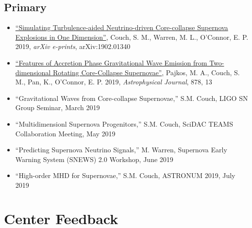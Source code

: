 \documentclass[12pt,titlepage]{article}
\begin{document}
\subsection{Primary}

\begin{itemize}
    \item \href{https://ui.adsabs.harvard.edu/#abs/2019arXiv190201340C/abstract}{``Simulating Turbulence-aided Neutrino-driven Core-collapse Supernova Explosions in One Dimension''}, Couch, S. M., Warren, M. L., O'Connor, E. P. 2019, {\itshape arXiv e-prints}, arXiv:1902.01340 
    \item \href{https://ui.adsabs.harvard.edu/#abs/2019arXiv190109055P/abstract}{``Features of Accretion Phase Gravitational Wave Emission from Two-dimensional Rotating Core-Collapse Supernovae''}, Pajkos, M. A., Couch, S. M., Pan, K., O'Connor, E. P. 2019, {\itshape Astrophysical Journal}, 878, 13
\end{itemize}


\begin{itemize}
  \item ``Gravitational Waves from Core-collapse Supernovae,'' S.M. Couch, LIGO SN Group Seminar, March 2019
  \item ``Multidimensionl Supernova Progenitors,'' S.M. Couch, SciDAC TEAMS Collaboration Meeting, May 2019
  \item ``Predicting Supernova Neutrino Signals,'' M. Warren, Supernova Early Warning System (SNEWS) 2.0 Workshop, June 2019
  \item ``High-order MHD for Supernovae,'' S.M. Couch, ASTRONUM 2019, July 2019
\end{itemize}



\section{Center Feedback}
\end{document}
